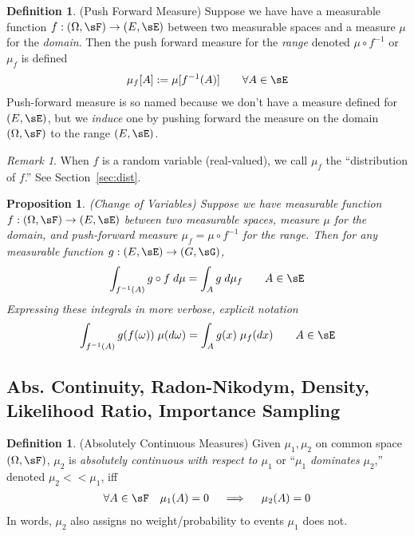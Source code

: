 \documentclass[12pt]{article}
\theoremstyle{plain}
\newtheorem{prop}[thm]{Proposition}
\theoremstyle{definition}
\newtheorem{defn}[thm]{Definition}
\theoremstyle{remark}
\newtheorem*{rmk}{Remark}
\newcommand{\ra}{\rightarrow}
\newenvironment{rcases}
  {\left.\begin{aligned}}
  {\end{aligned}\right\rbrace}
\begin{document}
\begin{defn}(Push Forward Measure)
\label{defn:pushfwd}
Suppose we have have a measurable function $f:(\Omega,\sF)\ra (E,\sE)$
between two measurable spaces and a measure $\mu$ for the \emph{domain}.
Then the push forward measure for the \emph{range} denoted $\mu \circ
f^{-1}$ or $\mu_f$ is defined
\begin{align*}
  \mu_f[A] := \mu[f^{-1}(A)]
  \qquad\forall A \in\sE
\end{align*}
Push-forward measure is so named because we don't have a measure
defined for $(E,\sE)$, but we \emph{induce} one by pushing forward the
measure on the domain $(\Omega,\sF)$ to the range $(E,\sE)$.
\end{defn}
\begin{rmk}
When $f$ is a random variable (real-valued), we call $\mu_f$ the
``distribution of $f$.'' See Section~\ref{sec:dist}.
\end{rmk}

\begin{prop}\emph{(Change of Variables)}
\label{prop:changeofvars}
Suppose we have measurable function $f:(\Omega,\sF)\ra (E,\sE)$ between
two measurable spaces, measure $\mu$ for the \emph{domain},
and push-forward measure $\mu_f=\mu \circ f^{-1}$ for the range. Then
for any measurable function $g:(E,\sE)\ra(G,\sG)$,
\begin{align*}
  \int_{f^{-1}(A)} g\circ f \; d\mu
  =
  \int_A g\;d\mu_f
  \qquad A \in \sE
\end{align*}
Expressing these integrals in more verbose, explicit notation
\begin{align*}
  \int_{f^{-1}(A)} g(f(\omega)) \; \mu(d\omega)
  =
  \int_A g(x)\;\mu_f(dx)
  \qquad A \in \sE
\end{align*}
\end{prop}


\clearpage
\subsection{%
  Abs. Continuity, Radon-Nikodym, Density, Likelihood Ratio,
  Importance Sampling
}
\label{sec:abscts}

\begin{defn}(Absolutely Continuous Measures)
Given $\mu_1,\mu_2$ on common space $(\Omega,\sF)$, $\mu_2$ is
\emph{absolutely continuous with respect to $\mu_1$}
or ``$\mu_1$ \emph{dominates} $\mu_2$,'' denoted $\mu_2<<\mu_1$, iff
\begin{align*}
  \forall A\in\sF
  \quad
  \mu_1(A) = 0
  \quad\implies\quad
  \mu_2(A) = 0
\end{align*}
In words, $\mu_2$ also assigns no weight/probability to events $\mu_1$
does not.
\end{defn}
\end{document}
